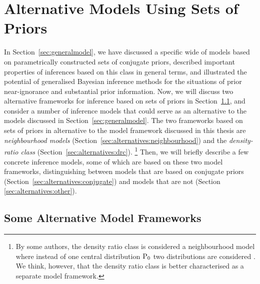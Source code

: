 \section{Alternative Models Using Sets of Priors}
\label{sec:alternatives}


In Section~\ref{sec:generalmodel},
we have discussed a specific wide of models based on parametrically constructed sets of conjugate priors,
described important properties of inferences based on this class in general terms,
and illustrated the potential of generalised Bayesian inference methods
for the situations of prior near-ignorance and substantial prior information.
Now, we will discuss two alternative frameworks for inference based on sets of priors in Section~\ref{sec:alternatives:frameworks},
and consider a number of inference models that could serve as an alternative to the models discussed in Section~\ref{sec:generalmodel}.
The two frameworks based on sets of priors
in alternative to the model framework discussed in this thesis are 
\emph{neighbourhood models} (Section~\ref{sec:alternatives:neighbourhood}) and
the \emph{density-ratio class} (Section~\ref{sec:alternatives:drc}).%
\footnote{By some authors, the density ratio class is considered a neighbourhood model
where instead of one central distribution $\operatorname{P}_0$ two distributions are considered
\parencite[e.g.,][\S 4.3]{1991:pericchi}.
We think, however, that the density ratio class is better characterised as a separate model framework.}
Then, we will briefly describe a few concrete inference models,
some of which are based on these two model frameworks,
distinguishing between models that are based on conjugate priors (Section~\ref{sec:alternatives:conjugate})
and models that are not (Section \ref{sec:alternatives:other}).


\subsection{Some Alternative Model Frameworks}
\label{sec:alternatives:frameworks}

